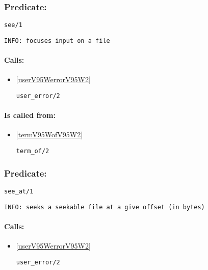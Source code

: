 \subsubsection{Predicate:} \label{seeV95W1}

\begin{verbatim}
see/1
\end{verbatim}

{\small \begin{verbatim}
INFO: focuses input on a file

\end{verbatim}}
\paragraph{Calls:} 
\begin{itemize}
\item \ref{userV95WerrorV95W2} 
\begin{verbatim}
user_error/2
\end{verbatim}

\end{itemize}
\paragraph{Is called from:} 
\begin{itemize}
\item \ref{termV95WofV95W2} 
\begin{verbatim}
term_of/2
\end{verbatim}

\end{itemize}

\subsubsection{Predicate:} \label{seeV95WatV95W1}

\begin{verbatim}
see_at/1
\end{verbatim}

{\small \begin{verbatim}
INFO: seeks a seekable file at a give offset (in bytes)

\end{verbatim}}
\paragraph{Calls:} 
\begin{itemize}
\item \ref{userV95WerrorV95W2} 
\begin{verbatim}
user_error/2
\end{verbatim}

\end{itemize}

